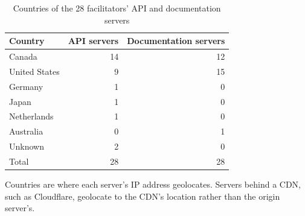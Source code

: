 \begin{table}[htbp]
  \centering
  \caption{Countries of the 28 facilitators' API and documentation servers}
  \label{tab:facilitators-countries}
  \begin{tabular}{lrr}
    \toprule
    Country & API servers & Documentation servers \\
    \midrule
    Canada & 14 & 12 \\
    United States & 9 & 15 \\
    Germany & 1 & 0 \\
    Japan & 1 & 0 \\
    Netherlands & 1 & 0 \\
    Australia & 0 & 1 \\
    Unknown & 2 & 0 \\
    \midrule
    Total & 28 & 28 \\
    \bottomrule
  \end{tabular}

  \smallskip
  \footnotesize Countries are where each server's IP address geolocates. Servers behind a CDN, such as
  Cloudflare, geolocate to the CDN's location rather than the origin server's.
\end{table}
